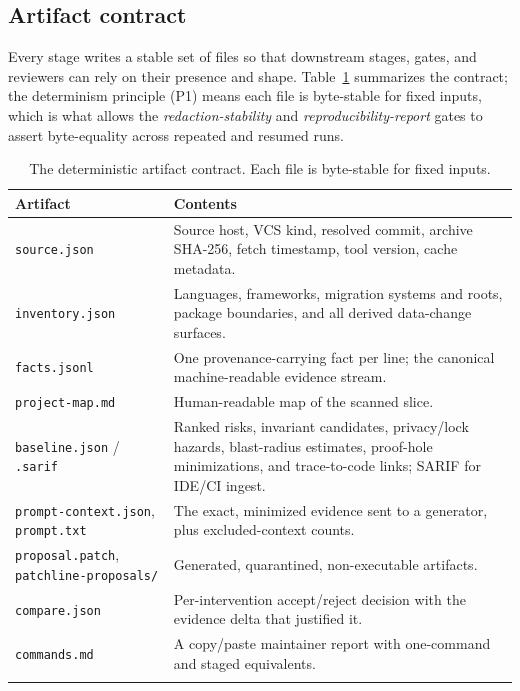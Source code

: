 \documentclass[11pt]{article}
\newcommand{\code}[1]{\texttt{#1}}
\begin{document}
\subsection{Artifact contract}
Every stage writes a stable set of files so that downstream stages, gates, and reviewers can rely on
their presence and shape. Table~\ref{tab:artifacts} summarizes the contract; the determinism
principle (P1) means each file is byte-stable for fixed inputs, which is what allows the
\emph{redaction-stability} and \emph{reproducibility-report} gates to assert byte-equality across
repeated and resumed runs.

\begin{longtable}{>{\raggedright\arraybackslash}p{3.4cm}>{\raggedright\arraybackslash}p{10.6cm}}
\toprule
\textbf{Artifact} & \textbf{Contents} \\
\midrule
\endhead
\code{source.json} & Source host, VCS kind, resolved commit, archive SHA-256, fetch timestamp, tool
version, cache metadata. \\
\code{inventory.json} & Languages, frameworks, migration systems and roots, package boundaries, and
all derived data-change surfaces. \\
\code{facts.jsonl} & One provenance-carrying fact per line; the canonical machine-readable evidence
stream. \\
\code{project-map.md} & Human-readable map of the scanned slice. \\
\code{baseline.json} / \code{.sarif} & Ranked risks, invariant candidates, privacy/lock hazards,
blast-radius estimates, proof-hole minimizations, and trace-to-code links; SARIF for IDE/CI ingest. \\
\code{prompt-context.json}, \code{prompt.txt} & The exact, minimized evidence sent to a generator,
plus excluded-context counts. \\
\code{proposal.patch}, \code{patchline-proposals/} & Generated, quarantined, non-executable
artifacts. \\
\code{compare.json} & Per-intervention accept/reject decision with the evidence delta that justified
it. \\
\code{commands.md} & A copy/paste maintainer report with one-command and staged equivalents. \\
\bottomrule
\caption{The deterministic artifact contract. Each file is byte-stable for fixed inputs.}
\label{tab:artifacts}
\end{longtable}

\end{document}
